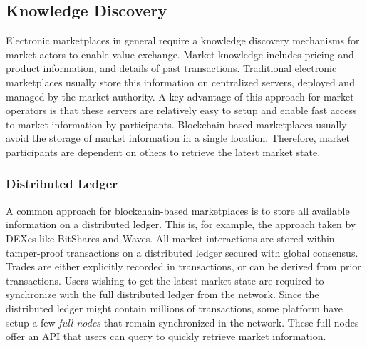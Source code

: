 \subsection{Knowledge Discovery}
Electronic marketplaces in general require a knowledge discovery mechanisms for market actors to enable value exchange.
Market knowledge includes pricing and product information, and details of past transactions.
Traditional electronic marketplaces usually store this information on centralized servers, deployed and managed by the market authority.
A key advantage of this approach for market operators is that these servers are relatively easy to setup and enable fast access to market information by participants.
Blockchain-based marketplaces usually avoid the storage of market information in a single location.
Therefore, market participants are dependent on others to retrieve the latest market state.

\subsubsection{Distributed Ledger}
A common approach for blockchain-based marketplaces is to store all available information on a distributed ledger.
This is, for example, the approach taken by DEXes like BitShares and Waves.
All market interactions are stored within tamper-proof transactions on a distributed ledger secured with global consensus.
Trades are either explicitly recorded in transactions, or can be derived from prior transactions.
Users wishing to get the latest market state are required to synchronize with the full distributed ledger from the network.
Since the distributed ledger might contain millions of transactions, some platform have setup a few \emph{full nodes} that remain synchronized in the network.
These full nodes offer an API that users can query to quickly retrieve market information.

